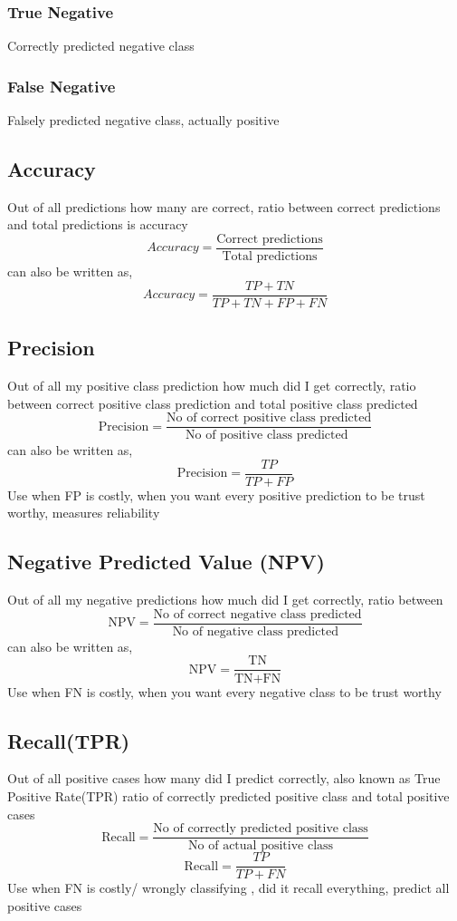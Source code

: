 \documentclass[12pt]{extarticle}
\begin{document}
\subsubsection{True Negative}
Correctly predicted negative class

\subsubsection{False Negative}
Falsely predicted negative class, actually positive 

\subsection{Accuracy}
Out of all predictions how many are correct, 
ratio between correct predictions and total predictions is accuracy
$$ Accuracy = \frac{\text{Correct predictions}} {\text{Total predictions}} $$
can also be written as,
$$ Accuracy = \frac{TP+TN}{TP+TN+FP+FN}  $$

\subsection{Precision}
Out of all my positive class prediction how much did I get correctly, 
ratio between correct positive class prediction and total positive class predicted
$$ \text{Precision} = \frac{\text{No of correct positive class predicted}}{\text{No of positive class predicted }} $$
can also be written as,
$$\text{Precision} = \frac{TP}{TP+FP}$$
Use when FP is costly, when you want every positive prediction to be trust worthy, measures reliability

\subsection{Negative Predicted Value (NPV)}
Out of all my negative predictions how much did I get correctly, 
ratio between
$$ \text{NPV} = \frac{\text{No of correct negative class predicted}}{\text{No of negative class predicted }} $$
can also be written as,
$$\text{NPV} = \frac{\text{TN}}{\text{TN} + \text{FN}}$$
Use when FN is costly, when you want every negative class to be trust worthy

\subsection{Recall(TPR)}
Out of all positive cases how many did I predict correctly, also known as True Positive Rate(TPR)
ratio of correctly predicted positive class and total positive cases
$$ \text{Recall} = \frac{\text{No of correctly predicted positive class}}{\text{No of actual positive class}}  $$
$$ \text{Recall} = \frac{TP}{TP+FN}$$
Use when FN is costly/ wrongly classifying , did it recall everything, predict all positive cases
\end{document}

